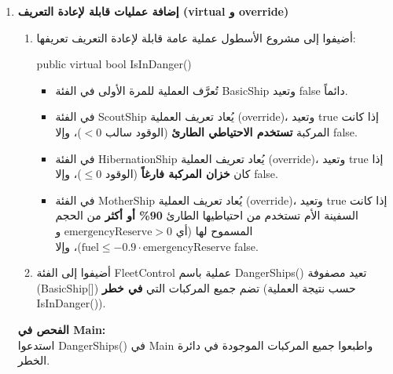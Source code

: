 \documentclass[14pt]{extarticle}
\begin{document}
\begin{enumerate}[resume, label=\textbf{تمرين \arabic*:}, wide=0pt, leftmargin=*, itemsep=2.2em]
    \item \textbf{إضافة عمليات قابلة لإعادة التعريف (\textenglish{virtual} و \textenglish{override})}
    \begin{enumerate}[label=\textbf{(\arabic*)}]
        \item أضيفوا إلى مشروع الأسطول عملية عامة قابلة لإعادة التعريف تعريفها:
        \begin{center}
        \textenglish{public virtual bool IsInDanger()}
        \end{center}
        \begin{itemize}
            \item تُعرَّف العملية للمرة الأولى في الفئة \textenglish{BasicShip} وتعيد \textenglish{false} دائماً.
            \item في الفئة \textenglish{ScoutShip} يُعاد تعريف العملية (\textenglish{override})، وتعيد \textenglish{true} إذا كانت المركبة \textbf{تستخدم الاحتياطي الطارئ} (الوقود سالب $< 0$)، وإلا \textenglish{false}.
            \item في الفئة \textenglish{HibernationShip} يُعاد تعريف العملية (\textenglish{override})، وتعيد \textenglish{true} إذا كان \textbf{خزان المركبة فارغاً} (الوقود $\le 0$)، وإلا \textenglish{false}.
            \item في الفئة \textenglish{MotherShip} يُعاد تعريف العملية (\textenglish{override})، وتعيد \textenglish{true} إذا كانت السفينة الأم تستخدم من احتياطيها الطارئ \textbf{90\% أو أكثر} من الحجم المسموح لها (أي $\text{emergencyReserve} > 0$ و $\text{fuel} \le -0.9 \cdot \text{emergencyReserve}$)، وإلا \textenglish{false}.
        \end{itemize}
        \item أضيفوا إلى الفئة \textenglish{FleetControl} عملية باسم \textenglish{DangerShips()} تعيد مصفوفة (\textenglish{BasicShip[]}) تضم جميع المركبات التي \textbf{في خطر} (حسب نتيجة العملية \textenglish{IsInDanger()}).
    \end{enumerate}
    \textbf{الفحص في \textenglish{Main}:} \\
    استدعوا \textenglish{DangerShips()} في \textenglish{Main} واطبعوا جميع المركبات الموجودة في دائرة الخطر.


\end{enumerate}
\end{document}
